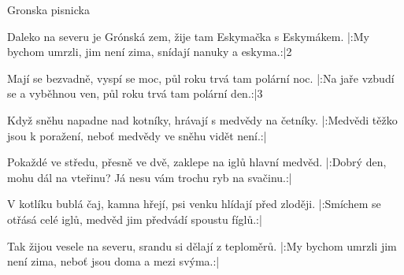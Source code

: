 \song Gronska pisnicka
\author{Jaromír Nohavica}

\verse

Daleko na severu je Grónská zem,
žije tam Eskymačka s Eskymákem.
|:My bychom umrzli, jim není zima,
snídají nanuky a eskyma.:|{2}

\verse
Mají se bezvadně, vyspí se moc,
půl roku trvá tam polární noc.
|:Na jaře vzbudí se a vyběhnou ven,
půl roku trvá tam polární den.:|3

\verse
Když sněhu napadne nad kotníky,
hrávají s medvědy na četníky.
|:Medvědi těžko jsou k poražení,
neboť medvědy ve sněhu vidět není.:|

\beginverse
Pokaždé ve středu, přesně ve dvě,
zaklepe na iglů hlavní medvěd.
|:Dobrý den, mohu dál na vteřinu?
Já nesu vám trochu ryb na svačinu.:|
\endverse

\beginverse
V kotlíku bublá čaj, kamna hřejí,
psi venku hlídají před zloději.
|:Smíchem se otřásá celé iglů,
medvěd jim předvádí spoustu fíglů.:|
\endverse

\beginverse
Tak žijou vesele na severu,
srandu si dělají z teploměrů.
|:My bychom umrzli jim není zima,
neboť jsou doma a mezi svýma.:|{}
\endverse